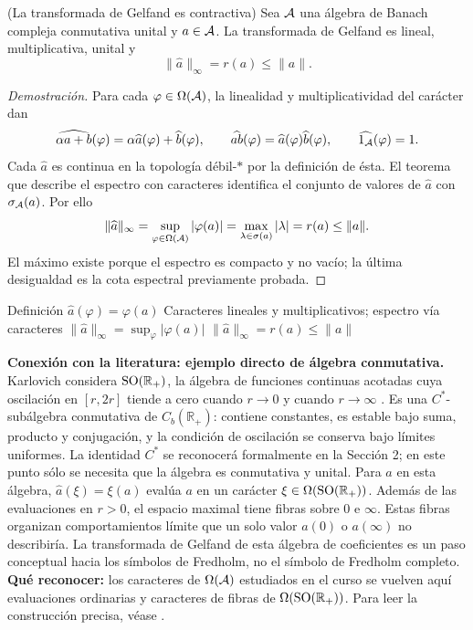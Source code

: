 \begin{cthproposicion}{(La transformada de Gelfand es contractiva)}
Sea $\mathcal A$ una álgebra de Banach compleja conmutativa unital y
$a\in\mathcal A$. La transformada de Gelfand es lineal, multiplicativa,
unital y
\[
 \|\widehat a\|_\infty=r(a)\le\|a\|.
\]
\end{cthproposicion}

\begin{proof}[Demostración]
Para cada $\varphi\in\Omega(\mathcal A)$, la linealidad y
multiplicatividad del carácter dan
\[
 \widehat{\alpha a+b}(\varphi)
   =\alpha\widehat a(\varphi)+\widehat b(\varphi),\qquad
 \widehat{ab}(\varphi)=\widehat a(\varphi)\widehat b(\varphi),
 \qquad \widehat{1_\mathcal A}(\varphi)=1.
\]
Cada $\widehat a$ es continua en la topología débil-$*$ por la
definición de ésta. El teorema que describe el espectro con
caracteres identifica el conjunto de valores de $\widehat a$
con $\sigma_\mathcal A(a)$. Por ello
\[
 \|\widehat a\|_\infty=\sup_{\varphi\in\Omega(\mathcal A)}|\varphi(a)|
 =\max_{\lambda\in\sigma(a)}|\lambda|=r(a)\le\|a\|.
\]
El máximo existe porque el espectro es compacto y no vacío;
la última desigualdad es la cota espectral previamente probada.
\end{proof}

\proofdiagram
{Definición $\widehat a(\varphi)=\varphi(a)$}
{Caracteres lineales y multiplicativos; espectro vía caracteres}
{$\|\widehat a\|_\infty=\sup_{\varphi}|\varphi(a)|$}
{$\|\widehat a\|_\infty=r(a)\le\|a\|$}

\begin{investigacion}[unbreakable]
\textbf{Conexión con la literatura: ejemplo directo de álgebra conmutativa.}
Karlovich considera $\operatorname{SO}(\mathbb R_+)$, la álgebra de funciones continuas acotadas cuya
oscilación en $[r,2r]$ tiende a cero cuando $r\to0$ y cuando $r\to\infty$
\cite[pp.~465--466, §2]{Karlovich2017}. Es una $C^*$-subálgebra conmutativa de
$C_b(\mathbb R_+)$: contiene constantes, es estable bajo suma, producto y conjugación, y
la condición de oscilación se conserva bajo límites uniformes. La identidad
$C^*$ se reconocerá formalmente en la Sección 2; en este punto sólo se
necesita que la álgebra es conmutativa y unital. Para $a$ en esta álgebra,
$\widehat a(\xi)=\xi(a)$ evalúa $a$ en un carácter $\xi\in\Omega(\operatorname{SO}(\mathbb R_+))$.
Además de las evaluaciones en $r>0$, el espacio maximal tiene fibras sobre $0$ e
$\infty$. Estas fibras organizan comportamientos límite que un solo valor $a(0)$ o
$a(\infty)$ no describiría. La transformada de Gelfand de esta álgebra de coeficientes
es un paso conceptual hacia los símbolos de Fredholm, no el símbolo de Fredholm completo.
\textbf{Qué reconocer:} los caracteres de $\Omega(\mathcal A)$ estudiados en el curso
se vuelven aquí evaluaciones ordinarias y caracteres de fibras de
$\Omega(\operatorname{SO}(\mathbb R_+))$. Para leer la construcción precisa, véase
\cite[§2, proposiciones~2.1--2.2]{Karlovich2017}.
\end{investigacion}

